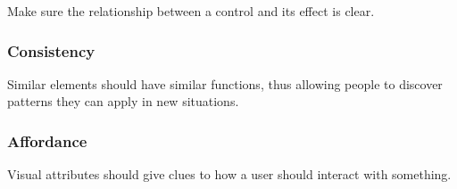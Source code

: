 Make sure the relationship between a control and its effect is clear.


\subsubsection{Consistency}

Similar elements should have similar functions, thus allowing people to discover patterns they can
apply in new situations.


\subsubsection{Affordance}

Visual attributes should give clues to how a user should interact with something.